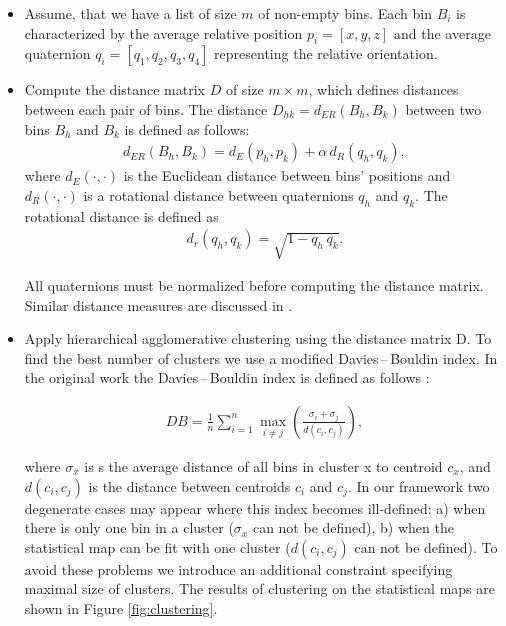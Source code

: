 \documentclass[runningheads]{llncs}
\begin{document}
\begin{itemize}
    \item Assume, that we have a list of size $m$ of non-empty bins. Each bin $B_i$ is
    characterized by the average relative position $p_i = [x,y,z]$ and the average quaternion $q_i = [q_1,q_2,q_3,q_4]$ representing
    the relative orientation.
    \item Compute the distance matrix $D$ of size $m \times m$,
    which defines distances between each pair of bins.
    The distance $D_{hk} = d_{ER}(B_h, B_k)$ between two bins $B_h$ and $B_k$ is defined as follows:
    \begin{align}
        d_{ER}(B_h, B_k) = d_E(p_h, p_k) + \alpha \, d_R(q_h, q_k),
    \end{align}
    where $d_E(\cdot,\cdot)$ is the Euclidean distance between
    bins' positions and $d_R(\cdot,\cdot)$ is a rotational distance
    between quaternions $q_h$ and $q_k$.
    The rotational distance is defined as
    \begin{align}
        d_r(q_h, q_k) = \sqrt{1 - q_h \, q_k}.
    \end{align}

    All quaternions must be normalized before computing the distance
    matrix. Similar distance measures are discussed in
    \cite{kuffner2004effective}.
    \item Apply hierarchical agglomerative clustering using the distance
    matrix D. To find the best number of clusters we use a
    modified Davies\,--\,Bouldin index. In the original work the Davies\,--\,Bouldin
    index is defined as follows \cite{davies1979cluster}:

    \begin{align}
    DB = \frac{1}{n}\sum\limits_{i=1}^{n} \max\limits_{i \neq j}^{} \left(\frac{\sigma_i + \sigma_j}{d(c_i, c_j)}\right),
    \end{align}

    where $\sigma_x$ is s the average distance of all bins in cluster x
    to centroid $c_x$, and $d(c_i,c_j)$ is the distance between centroids $c_i$ and
    $c_j$.
    In our framework two degenerate cases may appear where this index
    becomes ill-defined: a) when there is only one bin in a cluster ($\sigma_x$ can not be
    defined), b) when the statistical map can be fit with one cluster
    ($d(c_i, c_j)$ can not be defined). To avoid these
    problems we introduce an additional constraint specifying maximal size of
    clusters. The results of clustering on the statistical maps are shown in
    Figure \ref{fig:clustering}.


\end{itemize}
\end{document}
